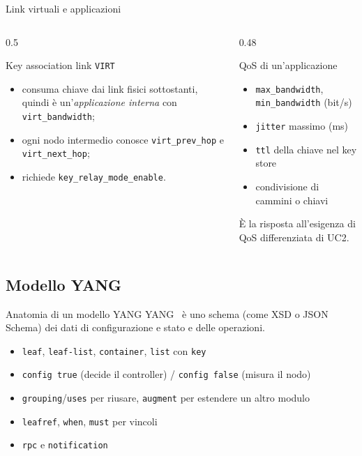 \documentclass[10pt]{beamer}
\begin{document}
\begin{frame}{Link virtuali e applicazioni}
  \begin{columns}[T]
    \begin{column}{0.5\textwidth}
      \begin{block}{Key association link \texttt{VIRT}}
        \begin{itemize}
          \item consuma chiave dai link fisici sottostanti, quindi è
                un'\emph{applicazione interna} con
                \texttt{virt\_bandwidth};
          \item ogni nodo intermedio conosce
                \texttt{virt\_prev\_hop} e \texttt{virt\_next\_hop};
          \item richiede \texttt{key\_relay\_mode\_enable}.
        \end{itemize}
      \end{block}
    \end{column}
    \begin{column}{0.48\textwidth}
      \begin{block}{QoS di un'applicazione}
        \begin{itemize}
          \item \texttt{max\_bandwidth}, \texttt{min\_bandwidth} (bit/s)
          \item \texttt{jitter} massimo (ms)
          \item \texttt{ttl} della chiave nel key store
          \item condivisione di cammini o chiavi
        \end{itemize}
      \end{block}
      \small È la risposta all'esigenza di QoS differenziata di UC2.
    \end{column}
  \end{columns}
\end{frame}

\subsection{Modello YANG}

\begin{frame}{Anatomia di un modello YANG}
  YANG~\cite{rfc7950} è uno \alert{schema} (come XSD o JSON
      Schema) dei dati di configurazione e stato e delle operazioni.
  \begin{itemize}
        \item \texttt{leaf}, \texttt{leaf-list}, \texttt{container},
              \texttt{list} con \texttt{key}
        \item \texttt{config true} (decide il controller) /
              \texttt{config false} (misura il nodo)
        \item \texttt{grouping}/\texttt{uses} per riusare,
              \texttt{augment} per estendere un altro modulo
        \item \texttt{leafref}, \texttt{when}, \texttt{must} per vincoli
        \item \texttt{rpc} e \texttt{notification}
      \end{itemize}
\end{frame}
\end{document}
